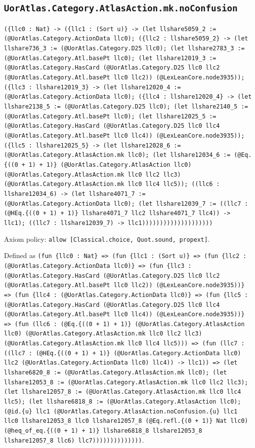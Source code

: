 \documentclass[11pt]{article}
\begin{document}
\subsection*{\texttt{UorAtlas.Category.AtlasAction.mk.noConfusion}}
\noindent\texttt{(\{llc0 : Nat\} -> (\{llc1 : (Sort u)\} -> (let llshare5059\_2 := (@UorAtlas.Category.ActionData llc0); (\{llc2 : llshare5059\_2\} -> (let llshare736\_3 := (@UorAtlas.Category.D25 llc0); (let llshare2783\_3 := (@UorAtlas.Category.Atl.basePt llc0); (let llshare12019\_3 := (@UorAtlas.Category.HasCard (@UorAtlas.Category.D25 llc0 llc2 (@UorAtlas.Category.Atl.basePt llc0 llc2)) (@LexLeanCore.node3935)); (\{llc3 : llshare12019\_3\} -> (let llshare12020\_4 := (@UorAtlas.Category.ActionData llc0); (\{llc4 : llshare12020\_4\} -> (let llshare2138\_5 := (@UorAtlas.Category.D25 llc0); (let llshare2140\_5 := (@UorAtlas.Category.Atl.basePt llc0); (let llshare12025\_5 := (@UorAtlas.Category.HasCard (@UorAtlas.Category.D25 llc0 llc4 (@UorAtlas.Category.Atl.basePt llc0 llc4)) (@LexLeanCore.node3935)); (\{llc5 : llshare12025\_5\} -> (let llshare12028\_6 := (@UorAtlas.Category.AtlasAction.mk llc0); (let llshare12034\_6 := (@Eq.\{((0 + 1) + 1)\} (@UorAtlas.Category.AtlasAction llc0) (@UorAtlas.Category.AtlasAction.mk llc0 llc2 llc3) (@UorAtlas.Category.AtlasAction.mk llc0 llc4 llc5)); ((llc6 : llshare12034\_6) -> (let llshare4071\_7 := (@UorAtlas.Category.ActionData llc0); (let llshare12039\_7 := ((llc7 : (@HEq.\{((0 + 1) + 1)\} llshare4071\_7 llc2 llshare4071\_7 llc4)) -> llc1); ((llc7 : llshare12039\_7) -> llc1))))))))))))))))))))}\par
\noindent Axiom policy: \texttt{allow [Classical.choice, Quot.sound, propext]}.\par
\noindent Defined as \texttt{(fun \{llc0 : Nat\} => (fun \{llc1 : (Sort u)\} => (fun \{llc2 : (@UorAtlas.Category.ActionData llc0)\} => (fun \{llc3 : (@UorAtlas.Category.HasCard (@UorAtlas.Category.D25 llc0 llc2 (@UorAtlas.Category.Atl.basePt llc0 llc2)) (@LexLeanCore.node3935))\} => (fun \{llc4 : (@UorAtlas.Category.ActionData llc0)\} => (fun \{llc5 : (@UorAtlas.Category.HasCard (@UorAtlas.Category.D25 llc0 llc4 (@UorAtlas.Category.Atl.basePt llc0 llc4)) (@LexLeanCore.node3935))\} => (fun (llc6 : (@Eq.\{((0 + 1) + 1)\} (@UorAtlas.Category.AtlasAction llc0) (@UorAtlas.Category.AtlasAction.mk llc0 llc2 llc3) (@UorAtlas.Category.AtlasAction.mk llc0 llc4 llc5))) => (fun (llc7 : ((llc7 : (@HEq.\{((0 + 1) + 1)\} (@UorAtlas.Category.ActionData llc0) llc2 (@UorAtlas.Category.ActionData llc0) llc4)) -> llc1)) => (let llshare6820\_8 := (@UorAtlas.Category.AtlasAction.mk llc0); (let llshare12053\_8 := (@UorAtlas.Category.AtlasAction.mk llc0 llc2 llc3); (let llshare12057\_8 := (@UorAtlas.Category.AtlasAction.mk llc0 llc4 llc5); (let llshare6818\_8 := (@UorAtlas.Category.AtlasAction llc0); (@id.\{u\} llc1 (@UorAtlas.Category.AtlasAction.noConfusion.\{u\} llc1 llc0 llshare12053\_8 llc0 llshare12057\_8 (@Eq.refl.\{(0 + 1)\} Nat llc0) (@heq\_of\_eq.\{((0 + 1) + 1)\} llshare6818\_8 llshare12053\_8 llshare12057\_8 llc6) llc7))))))))))))))}.\par
\end{document}
